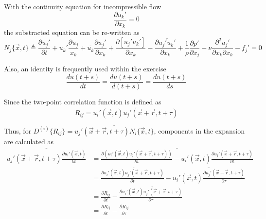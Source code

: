 \documentclass[paper=a4, fontsize=11pt]{scrartcl} %
\numberwithin{equation}{section} %
\numberwithin{figure}{section} %
\numberwithin{table}{section} %
\begin{document}
	With the continuity equation for incompressible flow
	\begin{equation}
		\frac{\partial u_k'}{\partial x_k} = 0 
	\end{equation}
	the substracted equation can be re-written as
	\begin{equation}
		N_j\{\vec{x}, t\} \triangleq \frac{\partial u_j'}{\partial t} + u_k' \frac{\partial \overline{u_j}}{x_k} + \overline{u_k}\frac{\partial u_j'}{\partial x_k} + \frac{\partial [u_j' u_k']}{\partial x_k} - \frac{\partial \overline{u_j' u_k'}}{\partial x_k} + \frac{1}{\rho} \frac{\partial p'}{\partial x_j}-\nu \frac{\partial^2 u_j'}{\partial x_k \partial x_k} - f_j' = 0
		\label{eq:sns}
	\end{equation}

	Also, an identity is frequently used within the exercise
	\begin{equation}
		\frac{d u(t+s)}{dt} = \frac{d u(t+s)}{d(t+s)} = \frac{d u(t+s)}{ds} 
	\end{equation}
	
	Since the two-point correlation function is defined as
	\begin{equation}
		R_{ij} = \overline{u_i'(\vec{x}, t) u_j'(\vec{x}+\vec{r}, t + \tau)}
	\end{equation}

	Thus, for $D^{(i)}\{R_{ij}\} = \overline{u_j'(\vec{x} + \vec{r}, t+\tau) N_i\{\vec{x}, t\}}$, components in the expansion are calculated as
	\begin{equation}
		\begin{aligned}
			\overline{u_j'(\vec{x} + \vec{r}, t+\tau) \frac{\partial u_i'(\vec{x}, t)}{\partial t}}  
			& = \overline{\frac{\partial (u_i'(\vec{x}, t)u_j'(\vec{x} + \vec{r}, t+\tau))}{\partial t} - u_i'(\vec{x}, t) \frac{\partial u_j'(\vec{x} + \vec{r}, t+\tau)}{\partial t}}\\
			& = \frac{\partial \overline{u_i'(\vec{x}, t)u_j'(\vec{x} + \vec{r}, t+\tau)}}{\partial t} - \overline{u_i'(\vec{x}, t) \frac{\partial u_j'(\vec{x} + \vec{r}, t+\tau)}{\partial \tau}}\\
			& = \frac{\partial R_{ij}}{\partial t} - \frac{\partial \overline{u_i'(\vec{x}, t) u_j'(\vec{x} + \vec{r}, t+\tau)}}{\partial \tau}\\
			& = \frac{\partial R_{ij}}{\partial t} - \frac{\partial R_{ij}}{\partial \tau}
		\end{aligned}
	\end{equation} 
	
\end{document}
